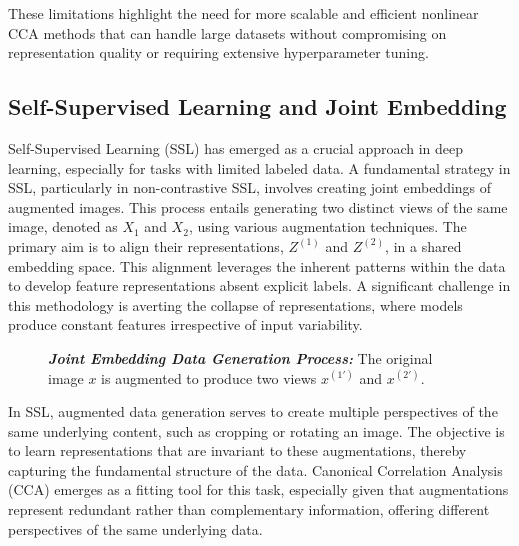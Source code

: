 These limitations highlight the need for more scalable and efficient nonlinear CCA methods that can handle large datasets without compromising on representation quality or requiring extensive hyperparameter tuning.

\subsection{Self-Supervised Learning and Joint Embedding}

Self-Supervised Learning (SSL) has emerged as a crucial approach in deep learning, especially for tasks with limited labeled data. A fundamental strategy in SSL, particularly in non-contrastive SSL, involves creating joint embeddings of augmented images. This process entails generating two distinct views of the same image, denoted as \( X_1 \) and \( X_2 \), using various augmentation techniques. The primary aim is to align their representations, \( Z^{(1)} \) and \( Z^{(2)} \), in a shared embedding space. This alignment leverages the inherent patterns within the data to develop feature representations absent explicit labels. A significant challenge in this methodology is averting the collapse of representations, where models produce constant features irrespective of input variability.

\begin{figure}[ht]
    \centering
    \caption[Joint Embedding Data Generation Process]{\textit{\textbf{Joint Embedding Data Generation Process:}} The original image \(x\) is augmented to produce two views \(x^{(1')}\) and \(x^{(2')}\).}
    \label{fig:joint-embedding}
\end{figure}

In SSL, augmented data generation serves to create multiple perspectives of the same underlying content, such as cropping or rotating an image. The objective is to learn representations that are invariant to these augmentations, thereby capturing the fundamental structure of the data. Canonical Correlation Analysis (CCA) emerges as a fitting tool for this task, especially given that augmentations represent redundant rather than complementary information, offering different perspectives of the same underlying data.

